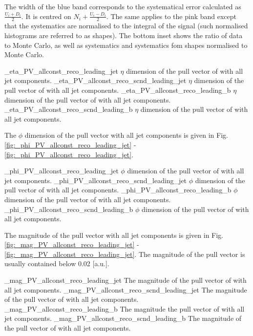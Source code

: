 The width of the blue band corresponds to the systematical error calculated as $\frac{U_{i}+D_{i}}{2}$. It is centred on $N_{i} + \frac{U_{i}-D_{i}}{2}$. The same applies to the pink band except that the systematics are normalised to the integral of the signal (such normalised histograms are referred to as shapes). The bottom inset shows the ratio of data to Monte Carlo, as well as systematics and systematics fom shapes normalised to Monte Carlo.

          {_eta_PV_allconst_reco_leading_jet}
          {$\eta$ dimension of the pull vector of \leadingjet with all jet components.}
          {_eta_PV_allconst_reco_scnd_leading_jet}
          {$\eta$ dimension of the pull vector of \scndleadingjet with all jet components.}
          {_eta_PV_allconst_reco_leading_b}
          {$\eta$ dimension of the pull vector of \leadingb with all jet components.}
          {_eta_PV_allconst_reco_scnd_leading_b}
          {$\eta$ dimension of the pull vector of \scndleadingb with all jet components.}

The $\phi$ dimension of the pull vector with all jet components is given in Fig. \ref{fig:_phi_PV_allconst_reco_leading_jet} - \ref{fig:_phi_PV_allconst_reco_leading_jet}. 

          {_phi_PV_allconst_reco_leading_jet}
          {$\phi$ dimension of the pull vector of \leadingjet with all jet components.}
          {_phi_PV_allconst_reco_scnd_leading_jet}
          {$\phi$ dimension of the pull vector of \scndleadingjet with all jet components.}
          {_phi_PV_allconst_reco_leading_b}
          {$\phi$ dimension of the pull vector of \leadingb with all jet components.}
          {_phi_PV_allconst_reco_scnd_leading_b}
          {$\phi$ dimension of the pull vector of \scndleadingb with all jet components.}

The magnitude of the pull vector with all jet components is given in Fig. \ref{fig:_mag_PV_allconst_reco_leading_jet} - \ref{fig:_mag_PV_allconst_reco_leading_jet}. The magnitude of the pull vector is usually contained below 0.02 [a.u.].

          {_mag_PV_allconst_reco_leading_jet}
          {The magnitude of the pull vector of \leadingjet with all jet components.}
          {_mag_PV_allconst_reco_scnd_leading_jet}
          {The magnitude of the pull vector of \scndleadingjet with all jet components.}
          {_mag_PV_allconst_reco_leading_b}
          {The magnitude the pull vector of \leadingb with all jet components.}
          {_mag_PV_allconst_reco_scnd_leading_b}
          {The magnitude of the pull vector of \scndleadingb with all jet components.}

